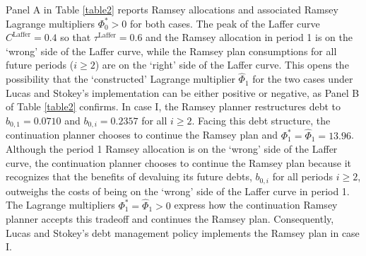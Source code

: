 \documentclass[12pt]{article}
\begin{document}


 Panel A in Table \ref{table2} reports  Ramsey allocations and  associated Ramsey Lagrange multipliers $\Phi_0^\ast>0$ for both cases. %
The peak of the Laffer curve $C_{}^{\text{Laffer}}=0.4$ so that $\tau_{}^{\text{Laffer}}=0.6$ and  the  Ramsey allocation in period 1 is on the `wrong' side of the Laffer curve, while the Ramsey plan  consumptions for all future periods ($i\geq 2$) are on the `right' side of the Laffer curve. 
This opens  the possibility that the `constructed' Lagrange multiplier  $\widehat{\Phi}_1$ for the two cases under Lucas and Stokey's implementation can be either positive or negative, %
{as  Panel B of Table \ref{table2} confirms.} %
In case I, the Ramsey planner restructures  debt to $b_{0, 1}=0.0710$ and $b_{0, i}=0.2357$  for all $i\geq 2$. Facing this debt structure, the continuation planner  chooses to continue  the Ramsey plan and $\Phi_1^*=\widehat{\Phi}_1=13.96$. Although the  period 1 Ramsey allocation is on the `wrong' side of the Laffer curve, the continuation planner  chooses to continue the Ramsey plan because it recognizes that the  benefits of devaluing its  future debts, $b_{0,i}$ for all  periods $i\geq 2$, outweighs the costs of being on  the `wrong' side of the Laffer curve in period 1. The Lagrange multipliers  $\Phi_1^*=\widehat{\Phi}_1>0$   express how the continuation Ramsey planner accepts this tradeoff and continues the Ramsey plan.
Consequently,  Lucas and Stokey's debt management policy  implements the Ramsey plan  in case I. %
\end{document}
